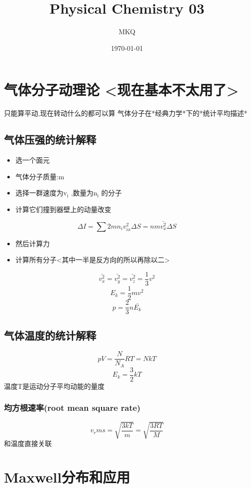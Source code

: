 \documentclass[11pt]{article}
\author{MKQ}
\date{\today}
\title{Physical Chemistry 03}
\begin{document}
\maketitle
\tableofcontents

\section{气体分子动理论 <现在基本不太用了>}
\label{sec:orgbf00a09}
只能算平动,现在转动什么的都可以算
气体分子在*经典力学*下的*统计平均描述*
\subsection{气体压强的统计解释}
\label{sec:org7547d02}
\begin{itemize}
\item 选一个面元
\item 气体分子质量:m
\item 选择一群速度为v\(_{\text{i}}\) ,数量为n\(_{\text{i}}\) 的分子
\item 计算它们撞到器壁上的动量改变
\end{itemize}
\[
\Delta I= \sum 2mn_i v_{ix}^2 \Delta S =nm\bar{v_{x}^2}\Delta S
\]
\begin{itemize}
\item 然后计算力
\item 计算所有分子<其中一半是反方向的所以再除以二>
\end{itemize}
\[
\bar{v_x^2}=\bar{v_y^2}=\bar{v_z^2}=\frac{1}{3} v^2
\]
\[
E_k =\frac{1}{2} m v^2
\]
\[
p=\frac{2}{3} n \bar{E_k}
\]
\subsection{气体温度的统计解释}
\label{sec:orgdf3cbfa}
\[
pV=\frac{N}{N_A}RT=NkT
\]
\[
E_k=\frac{3}{2} kT
\]
温度T是运动分子平均动能的量度
\subsubsection{均方根速率(root mean square rate)}
\label{sec:org6e63dcc}
\[
v_rms =\sqrt{\frac{3kT}{m}}=\sqrt{\frac{3RT}{M}}
\]
和温度直接关联
\section{Maxwell分布和应用}
\label{sec:orga4c235c}
\end{document}
